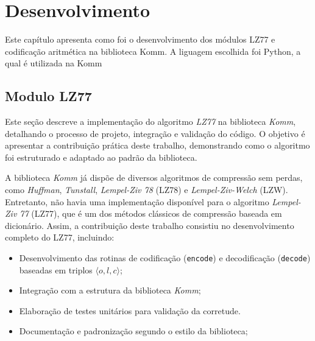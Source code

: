 \chapter{Desenvolvimento}\label{cap:desenvolvimento}

Este capítulo apresenta como foi o desenvolvimento dos módulos LZ77 e
codificação aritmética na biblioteca Komm. A liguagem escolhida foi Python, a
qual é utilizada na Komm

\section{Modulo LZ77}
Este seção descreve a implementação do algoritmo \textit{LZ77} na biblioteca
\textit{Komm}, detalhando o processo de projeto, integração e validação do
código. O objetivo é apresentar a contribuição prática deste trabalho,
demonstrando como o algoritmo foi estruturado e adaptado ao padrão da
biblioteca.

A biblioteca \textit{Komm} já dispõe de diversos algoritmos de compressão sem
perdas, como \textit{Huffman}, \textit{Tunstall}, \textit{Lempel-Ziv 78} (LZ78)
e \textit{Lempel-Ziv-Welch} (LZW). Entretanto, não havia uma implementação
disponível para o algoritmo \textit{Lempel-Ziv 77} (LZ77), que é um dos métodos
clássicos de compressão baseada em dicionário. Assim, a contribuição deste
trabalho consistiu no desenvolvimento completo do LZ77, incluindo:
\begin{itemize}
    \item Desenvolvimento das rotinas de codificação (\texttt{encode}) e decodificação
          (\texttt{decode}) baseadas em triplos $\langle o, l, c \rangle$;
    \item Integração com a estrutura da biblioteca \textit{Komm};
    \item Elaboração de testes unitários para validação da corretude.
    \item Documentação e padronização segundo o estilo da biblioteca;
\end{itemize}

